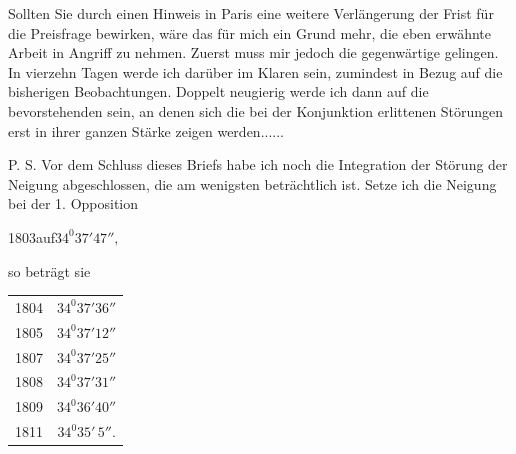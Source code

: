 \par
\noindent\hspace*{\parindent}Sollten Sie durch einen Hinweis in Paris eine weitere Verlängerung der Frist für die Preisfrage bewirken, wäre das für mich ein Grund mehr, die eben erwähnte Arbeit in Angriff zu nehmen. Zuerst muss mir jedoch die gegenwärtige gelingen. In vierzehn Tagen werde ich darüber im Klaren sein, zumindest in Bezug auf die bisherigen Beobachtungen. Doppelt neugierig werde ich dann auf die bevorstehenden sein, an denen sich die bei der Konjunktion erlittenen Störungen erst in ihrer ganzen Stärke zeigen werden.\quad.\quad.\quad.\quad.\quad.
\par
{}
\noindent\hspace*{\parindent}P. S. Vor dem Schluss dieses Briefs habe ich noch die Integration der Störung der Neigung abgeschlossen, die am wenigsten beträchtlich ist. Setze ich die Neigung bei der 1. Opposition
\begin{center}1803\quad auf\quad \(34^{0}37'47'',\)\end{center}
so beträgt sie
\begin{center}
\begin{tabular}{lc}
1804 & \(34^{0}37'36''\)\\
1805 & \(34^{0}37'12''\)\\
1807 & \(34^{0}37'25''\)\\
1808 & \(34^{0}37'31''\)\\
1809 & \(34^{0}36'40''\)\\
1811 & \(34^{0}35'\,5''.\)\\
\end{tabular}
\end{center}
\par
